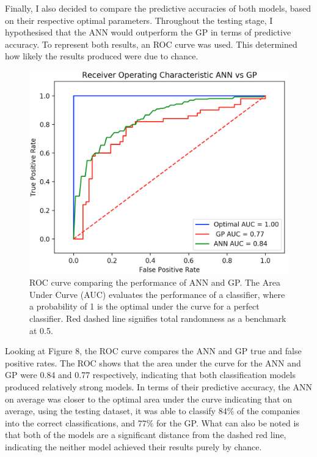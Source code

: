 \documentclass[11pt]{article}
\begin{document}
Finally, I also decided to compare the predictive accuracies of both models, based on their respective optimal parameters. Throughout the testing stage, I hypothesised that the ANN would outperform the GP in terms of predictive accuracy. To represent both results, an ROC curve was used. This  determined how likely the results produced were due to chance. 
\begin{figure}[h]
\centering
\includegraphics[scale = .50]{rocanngp}
\caption{ROC curve comparing the performance of ANN and GP. The Area Under Curve (AUC)  evaluates the performance of a classifier, where a probability of 1 is the optimal under the curve for a perfect classifier. Red dashed line signifies total randomness as a benchmark at 0.5.  } 
\end{figure}
Looking at Figure 8, the ROC curve compares the ANN and GP true and false positive rates. The ROC shows that the area under the curve for the ANN and GP were 0.84 and 0.77 respectively, indicating that both classification models produced relatively strong models. In terms of their predictive accuracy, the ANN on average was closer to the optimal area under the curve indicating that on average, using the testing dataset, it was able to classify 84\% of the companies into the correct classifications, and 77\% for the GP. What can also be noted is that both of the models are a significant distance from the dashed red line, indicating the neither model achieved their results purely by chance. \\
\end{document}
